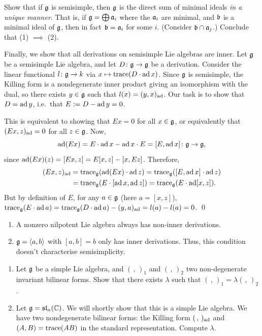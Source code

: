 \begin{exercise}
Show that if $\mathfrak{g}$ is semisimple, then $\mathfrak{g}$ is the direct sum of minimal ideals
\emph{in a unique manner}. That is, if $\mathfrak{g} = \bigoplus \mathfrak{a}_i$ where the
$\mathfrak{a}_i$ are minimal, and $\mathfrak{b}$ is a minimal ideal of $\mathfrak{g}$, then in fact
$\mathfrak{b} = \mathfrak{a}_i$ for some $i$. (Consider $\mathfrak{b} \cap \mathfrak{a}_j$.) Conclude that
(1) $\implies$ (2).
\end{exercise}

 Finally, we show that all derivations on semisimple Lie algebras
are inner. Let $\mathfrak{g}$ be a semisimple Lie algebra, and let $D\colon \mathfrak{g} \to \mathfrak{g}$ be
a derivation. Consider the linear functional $l\colon \mathfrak{g} \to k$ via
$x \mapsto \operatorname{trace}(D \cdot \operatorname{ad} x)$. Since $\mathfrak{g}$ is semisimple, the Killing form is a
nondegenerate inner product giving an isomorphism with the dual, so there
exists $y \in \mathfrak{g}$ such that $l(x) = (y, x)_{\operatorname{ad}}$. Our task is to show that
$D = \operatorname{ad} y$, i.e.\ that $E := D - \operatorname{ad} y = 0$.

This is equivalent to showing that $Ex = 0$ for all $x \in \mathfrak{g}$, or
equivalently that $(Ex, z)_{\operatorname{ad}} = 0$ for all $z \in \mathfrak{g}$. Now,
\[
  \operatorname{ad}(Ex) = E \cdot \operatorname{ad} x - \operatorname{ad} x \cdot E = [E, \operatorname{ad} x]\colon \mathfrak{g} \to \mathfrak{g},
\]
since $\operatorname{ad}(Ex)(z) = [Ex, z] = E[x, z] - [x, Ez]$. Therefore,
\begin{align*}
  (Ex, z)_{\operatorname{ad}} &= \operatorname{trace}_{\mathfrak{g}}(\operatorname{ad}(Ex) \cdot \operatorname{ad} z) = \operatorname{trace}_{\mathfrak{g}}([E, \operatorname{ad} x] \cdot \operatorname{ad} z)\\
    &= \operatorname{trace}_{\mathfrak{g}}(E \cdot [\operatorname{ad} x, \operatorname{ad} z]) = \operatorname{trace}_{\mathfrak{g}}(E \cdot \operatorname{ad}[x, z]).
\end{align*}
But by definition of $E$, for any $a \in \mathfrak{g}$ (here $a = [x, z]$),
$\operatorname{trace}_{\mathfrak{g}}(E \cdot \operatorname{ad} a) = \operatorname{trace}_{\mathfrak{g}}(D \cdot \operatorname{ad} a) - (y, a)_{\operatorname{ad}} = l(a) - l(a) = 0$.
\qed

\begin{exercise}\leavevmode
\begin{enumerate}
  \item A nonzero nilpotent Lie algebra always has non-inner derivations.
  \item $\mathfrak{g} = \langle a, b\rangle$ with $[a, b] = b$ only has inner
    derivations. Thus, this condition doesn't characterise semisimplicity.
\end{enumerate}
\end{exercise}

\begin{exercise}\leavevmode
\begin{enumerate}
  \item Let $\mathfrak{g}$ be a simple Lie algebra, and $(\,,\,)_1$ and $(\,,\,)_2$ two
    non-degenerate invariant bilinear forms. Show that there exists $\lambda$
    such that $(\,,\,)_1 = \lambda(\,,\,)_2$.
  \item Let $\mathfrak{g} = \mathfrak{sl}_n(\mathbb{C})$. We will shortly show that this is a simple Lie
    algebra. We have two nondegenerate bilinear forms: the Killing form
    $(\,,\,)_{\operatorname{ad}}$ and $(A, B) = \operatorname{trace}(AB)$ in the standard representation.
    Compute $\lambda$.
\end{enumerate}
\end{exercise}
